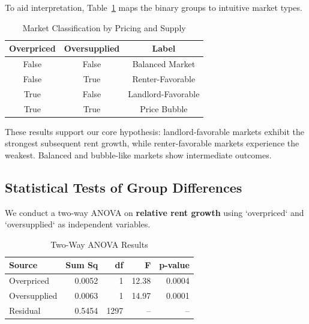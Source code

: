\documentclass[APA,Times1COL]{WileyNJDv5} %
\begin{document}
To aid interpretation, Table~\ref{tab:matrixlabels} maps the binary groups to intuitive market types.

\begin{table}[h!]
	\centering
	\caption*{Market Classification by Pricing and Supply}
	\label{tab:matrixlabels}
	\begin{tabular}{cc|c}
		\toprule
		\textbf{Overpriced} & \textbf{Oversupplied} & \textbf{Label} \\
		\midrule
		False & False & Balanced Market \\
		False & True & Renter-Favorable \\
		True  & False & Landlord-Favorable \\
		True  & True  & Price Bubble \\
		\bottomrule
	\end{tabular}
\end{table}

These results support our core hypothesis: landlord-favorable markets exhibit the strongest subsequent rent growth, while renter-favorable markets experience the weakest. Balanced and bubble-like markets show intermediate outcomes.

\subsection{Statistical Tests of Group Differences}

We conduct a two-way ANOVA on \textbf{relative rent growth} using `overpriced` and `oversupplied` as independent variables.

\begin{table}[h!]
	\centering
	\caption*{Two-Way ANOVA Results}
	\label{tab:anova_results}
	\begin{tabular}{lrrrr}
		\toprule
		\textbf{Source} & \textbf{Sum Sq} & \textbf{df} & \textbf{F} & \textbf{p-value} \\
		\midrule
		Overpriced     & 0.0052 & 1     & 12.38 & 0.0004 \\
		Oversupplied   & 0.0063 & 1     & 14.97 & 0.0001 \\
		Residual       & 0.5454 & 1297  & --    & --     \\
		\bottomrule
	\end{tabular}
\end{table}
\end{document}
